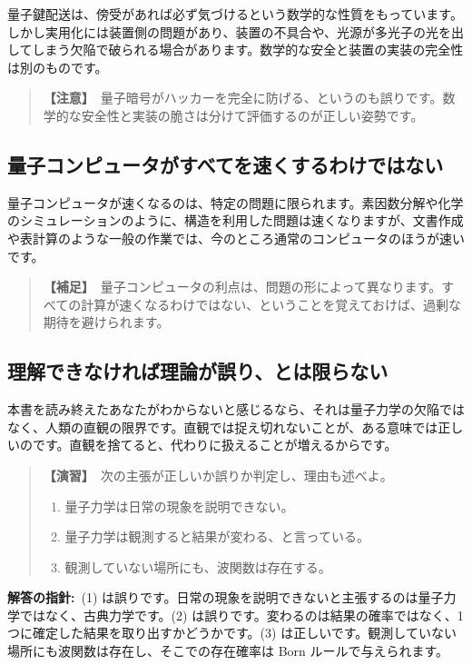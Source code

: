 \documentclass{article}
\begin{document}
量子鍵配送は、傍受があれば必ず気づけるという数学的な性質をもっています。しかし実用化には装置側の問題があり、装置の不具合や、光源が多光子の光を出してしまう欠陥で破られる場合があります。数学的な安全と装置の実装の完全性は別のものです。

\begin{quote}
\textbf{【注意】}\ 量子暗号がハッカーを完全に防げる、というのも誤りです。数学的な安全性と実装の脆さは分けて評価するのが正しい姿勢です。
\end{quote}

\subsection{量子コンピュータがすべてを速くするわけではない}

量子コンピュータが速くなるのは、特定の問題に限られます。素因数分解や化学のシミュレーションのように、構造を利用した問題は速くなりますが、文書作成や表計算のような一般の作業では、今のところ通常のコンピュータのほうが速いです。

\begin{quote}
\textbf{【補足】}\ 量子コンピュータの利点は、問題の形によって異なります。すべての計算が速くなるわけではない、ということを覚えておけば、過剰な期待を避けられます。
\end{quote}

\subsection{理解できなければ理論が誤り、とは限らない}

本書を読み終えたあなたがわからないと感じるなら、それは量子力学の欠陥ではなく、人類の直観の限界です。直観では捉え切れないことが、ある意味では正しいのです。直観を捨てると、代わりに扱えることが増えるからです。

\begin{quote}
\textbf{【演習】}\ 次の主張が正しいか誤りか判定し、理由も述べよ。
\begin{enumerate}
\item 量子力学は日常の現象を説明できない。
\item 量子力学は観測すると結果が変わる、と言っている。
\item 観測していない場所にも、波関数は存在する。
\end{enumerate}
\end{quote}

\textbf{解答の指針:}\ (1) は誤りです。日常の現象を説明できないと主張するのは量子力学ではなく、古典力学です。(2) は誤りです。変わるのは結果の確率ではなく、1 つに確定した結果を取り出すかどうかです。(3) は正しいです。観測していない場所にも波関数は存在し、そこでの存在確率は Born ルールで与えられます。
\end{document}
